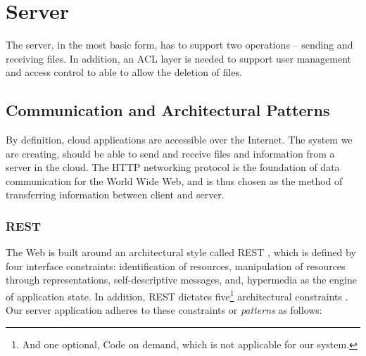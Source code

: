 \documentclass[pdftex,english,10pt,b5paper,twoside]{book}
\begin{document}
\section{Server}

The server, in the most basic form, has to support two operations -- sending
and receiving files. In addition, an \ac{ACL} layer is needed to support user
management and access control to able to allow the deletion of files.

\subsection{Communication and Architectural Patterns}

By definition, cloud applications are accessible over the Internet. The system
we are creating, should be able to send and receive files and information from a
server in the cloud. The \ac{HTTP} networking protocol is the foundation of data
communication for the World Wide Web, and is thus chosen as the method of
transferring information between client and server.

\subsubsection{\acs{REST}} The Web is built around an architectural style called
\ac{REST} \cite[ch. 5]{fielding}, which is defined by four interface
constraints: identification of resources, manipulation of resources through
representations, self-descriptive messages, and, hypermedia as the engine of
application state. In addition, \ac{REST} dictates five\footnote{And one
optional, Code on demand, which is not applicable for our system.} architectural
constraints \cite{fielding}. Our server application adheres to these
constraints or \emph{patterns} as follows:
\end{document}
